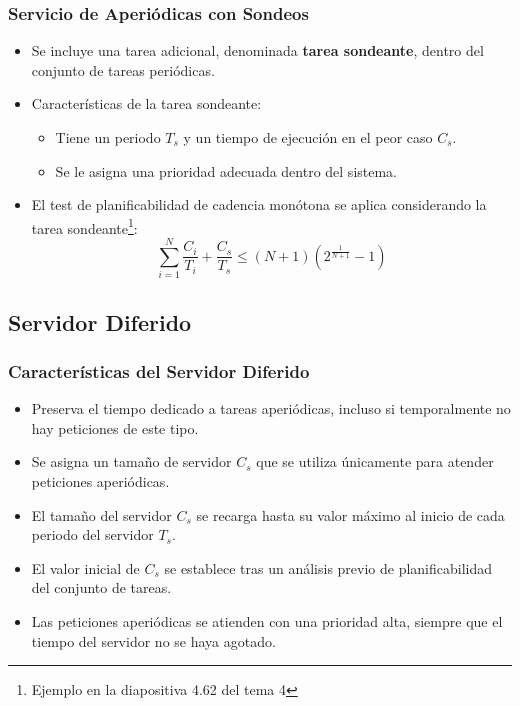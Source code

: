 \documentclass[a4paper,12pt]{article}
\begin{document}
\subsubsection{Servicio de Aperiódicas con Sondeos}
\begin{itemize}
    \item Se incluye una tarea adicional, denominada \textbf{tarea sondeante}, dentro del conjunto de tareas periódicas.
    \item Características de la tarea sondeante:
    \begin{itemize}
        \item Tiene un periodo \(T_s\) y un tiempo de ejecución en el peor caso \(C_s\).
        \item Se le asigna una prioridad adecuada dentro del sistema.
    \end{itemize}
    \item El test de planificabilidad de cadencia monótona se aplica considerando la tarea sondeante\footnote{Ejemplo en la diapositiva 4.62 del tema 4}:
    \[
    \sum_{i=1}^{N} \frac{C_i}{T_i} + \frac{C_s}{T_s} \leq (N + 1)\left(2^{\frac{1}{N+1}} - 1\right)
    \]
\end{itemize}

\subsection{Servidor Diferido}

\subsubsection{Características del Servidor Diferido}
\begin{itemize}
    \item Preserva el tiempo dedicado a tareas aperiódicas, incluso si temporalmente no hay peticiones de este tipo.
    \item Se asigna un tamaño de servidor \(C_s\) que se utiliza únicamente para atender peticiones aperiódicas.
    \item El tamaño del servidor \(C_s\) se recarga hasta su valor máximo al inicio de cada periodo del servidor \(T_s\).
    \item El valor inicial de \(C_s\) se establece tras un análisis previo de planificabilidad del conjunto de tareas.
    \item Las peticiones aperiódicas se atienden con una prioridad alta, siempre que el tiempo del servidor no se haya agotado.
\end{itemize}
\end{document}
